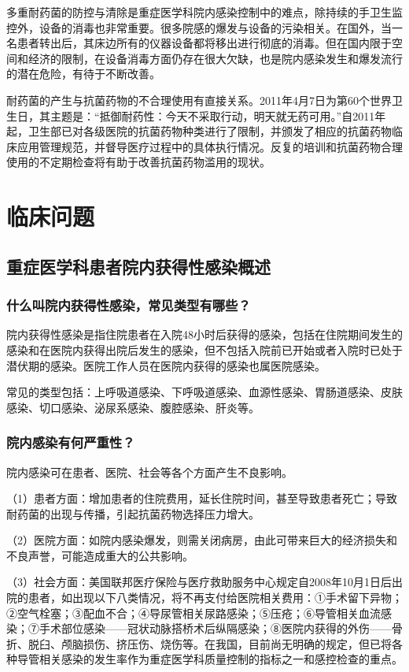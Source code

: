 多重耐药菌的防控与清除是重症医学科院内感染控制中的难点，除持续的手卫生监控外，设备的消毒也非常重要。很多院感的爆发与设备的污染相关。在国外，当一名患者转出后，其床边所有的仪器设备都将移出进行彻底的消毒。但在国内限于空间和经济的限制，在设备消毒方面仍存在很大欠缺，也是院内感染发生和爆发流行的潜在危险，有待于不断改善。

耐药菌的产生与抗菌药物的不合理使用有直接关系。2011年4月7日为第60个世界卫生日，其主题是：“抵御耐药性：今天不采取行动，明天就无药可用。”自2011年起，卫生部已对各级医院的抗菌药物种类进行了限制，并颁发了相应的抗菌药物临床应用管理规范，并督导医疗过程中的具体执行情况。反复的培训和抗菌药物合理使用的不定期检查将有助于改善抗菌药物滥用的现状。

\section{临床问题}

\subsection{重症医学科患者院内获得性感染概述}

\subsubsection{什么叫院内获得性感染，常见类型有哪些？}

院内获得性感染是指住院患者在入院48小时后获得的感染，包括在住院期间发生的感染和在医院内获得出院后发生的感染，但不包括入院前已开始或者入院时已处于潜伏期的感染。医院工作人员在医院内获得的感染也属医院感染。

常见的类型包括：上呼吸道感染、下呼吸道感染、血源性感染、胃肠道感染、皮肤感染、切口感染、泌尿系感染、腹腔感染、肝炎等。

\subsubsection{院内感染有何严重性？}

院内感染可在患者、医院、社会等各个方面产生不良影响。

（1）患者方面：增加患者的住院费用，延长住院时间，甚至导致患者死亡；导致耐药菌的出现与传播，引起抗菌药物选择压力增大。

（2）医院方面：如院内感染爆发，则需关闭病房，由此可带来巨大的经济损失和不良声誉，可能造成重大的公共影响。

（3）社会方面：美国联邦医疗保险与医疗救助服务中心规定自2008年10月1日后出院的患者，如出现以下八类情况，将不再支付给医院相关费用：①手术留下异物；②空气栓塞；③配血不合；④导尿管相关尿路感染；⑤压疮；⑥导管相关血流感染；⑦手术部位感染------冠状动脉搭桥术后纵隔感染；⑧医院内获得的外伤------骨折、脱臼、颅脑损伤、挤压伤、烧伤等。在我国，目前尚无明确的规定，但已将各种导管相关感染的发生率作为重症医学科质量控制的指标之一和感控检查的重点。


